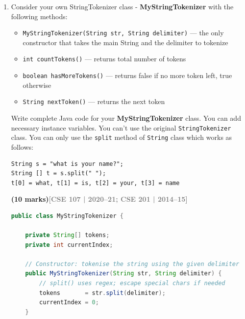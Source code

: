 \documentclass[12pt,a3paper]{article}
\newcommand{\yr}[1]{\hfill\textcolor{gray}{\small\textbf{[#1]}}}
\newcommand{\mk}[1]{\textcolor{orange!70!black}{\small\textbf{(#1 marks)}}}
\begin{document}
\begin{enumerate}
\begin{tcolorbox}[enhanced,breakable,ansbox,
  colback=cB!4,colframe=cB,boxrule=0.8pt,arc=5pt,
  title={\textbf{Answer --- \texttt{VarArgsTest}: Compiler Errors}},
  fonttitle=\bfseries\color{white},colbacktitle=cB]
\textbf{Answer: 2 out of the 4 calls} --- \texttt{f()} and
\texttt{f(1,2,3)} --- generate a compiler error due to ambiguity.

\end{tcolorbox}

\item Consider your own StringTokenizer class - \textbf{MyStringTokenizer} with the following methods:
\begin{tcolorbox}[colback=gray!5, colframe=gray!40, boxrule=0.5pt, arc=3pt]
\begin{itemize}[leftmargin=1.5em, itemsep=2pt]
  \item \texttt{MyStringTokenizer(String str, String delimiter)} --- the only constructor that takes the main String and the delimiter to tokenize
  \item \texttt{int countTokens()} --- returns total number of tokens
  \item \texttt{boolean hasMoreTokens()} --- returns false if no more token left, true otherwise
  \item \texttt{String nextToken()} --- returns the next token
\end{itemize}
\end{tcolorbox}
Write complete Java code for your \textbf{MyStringTokenizer} class. You can add necessary instance variables. You can't use the original \texttt{StringTokenizer} class. You can only use the \texttt{split} method of \texttt{String} class which works as follows:
\begin{verbatim}
String s = "what is your name?";
String [] t = s.split(" ");
t[0] = what, t[1] = is, t[2] = your, t[3] = name
\end{verbatim}
\mk{10}\yr{CSE 107 | 2020--21; CSE 201 | 2014--15}

\begin{tcolorbox}[enhanced,breakable,ansbox,
  colback=cB!4,colframe=cB,boxrule=0.8pt,arc=5pt,
  title={\textbf{Answer --- \texttt{MyStringTokenizer} Class}},
  fonttitle=\bfseries\color{white},colbacktitle=cB]

\begin{lstlisting}[language=Java]
public class MyStringTokenizer {

    private String[] tokens;
    private int currentIndex;

    // Constructor: tokenise the string using the given delimiter
    public MyStringTokenizer(String str, String delimiter) {
        // split() uses regex; escape special chars if needed
        tokens       = str.split(delimiter);
        currentIndex = 0;
    }


\end{lstlisting}
\end{tcolorbox}
\end{enumerate}
\end{document}
